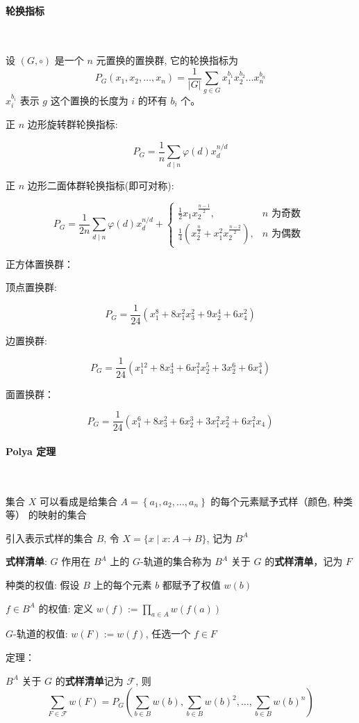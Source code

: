 \paragraph{轮换指标}\

设 $(G, \circ)$ 是一个 $n$ 元置换的置换群, 它的轮换指标为
$$
P_{G}\left(x_{1}, x_{2}, \ldots, x_{n}\right)=\frac{1}{|G|} \sum_{g \in G} x_{1}^{b_{1}} x_{2}^{b_{2}} \ldots x_{n}^{b_{n}}
$$
$x_i^{b_i}$ 表示 $g$ 这个置换的长度为 $i$ 的环有 $b_i$ 个。

正 $n$ 边形旋转群轮换指标:

$$
P_G=\frac{1}{n}\sum_{d\mid n}\varphi(d)x_d^{n/d}
$$

正 $n$ 边形二面体群轮换指标(即可对称):

$$
P_{G}=\frac{1}{2 n} \sum_{d \mid n} \varphi(d) x_{d}^{n / d}+\left\{\begin{array}{ll}
\frac{1}{2} x_{1} x_{2}^{\frac{n-1}{2}}, \quad &n \text { 为奇数 } \\
\frac{1}{4}\left(x_{2}^{\frac{n}{2}}+x_{1}^{2} x_{2}^{\frac{n-2}{2}}\right), &n \text { 为偶数 }
\end{array}\right.
$$

正方体置换群：

顶点置换群:

$$
P_{G}=\frac{1}{24}\left(x_{1}^{8}+8 x_{1}^{2} x_{3}^{2}+9 x_{2}^{4}+6 x_{4}^{2}\right)
$$

边置换群:

$$
P_{G}=\frac{1}{24}\left(x_{1}^{12}+8 x_{3}^{4}+6 x_{1}^{2} x_{2}^{5}+3 x_{2}^{6}+6 x_{4}^{3}\right)
$$

面置换群：

$$
P_{G}=\frac{1}{24}\left(x_{1}^{6}+8 x_{3}^{2}+6 x_{2}^{3}+3 x_{1}^{2} x_{2}^{2}+6 x_{1}^{2} x_{4}\right)
$$



\paragraph{Polya 定理}\

集合 $X$ 可以看成是给集合 $A=\left\{a_{1}, a_{2}, \ldots, a_{n}\right\}$ 的每个元素赋予式样（颜色, 种类等） 的映射的集合

引入表示式样的集合 $B$, 令 $X=\{x \mid x: A \rightarrow B\}$, 记为 $B^{A}$

\textbf{式样清单}: $G$ 作用在 $B^{A}$ 上的 $G$-轨道的集合称为 $B^{A}$ 关于 $G$ 的\textbf{式样清单}，记为 $F$

种类的权值: 假设 $B$ 上的每个元素 $b$ 都赋予了权值 $w(b)$

$f \in B^{A}$ 的权值: 定义 $w(f):=\prod_{a \in A} w(f(a))$

$G$-轨道的权值: $w(F):=w(f)$, 任选一个 $f \in F$

定理：

$B^{A}$ 关于 $G$ 的\textbf{式样清单}记为 $\mathcal{F}$, 则
$$
\sum_{F \in \mathcal{F}} w(F)=P_{G}\left(\sum_{b \in B} w(b), \sum_{b \in B} w(b)^{2}, \ldots, \sum_{b \in B} w(b)^{n}\right)
$$